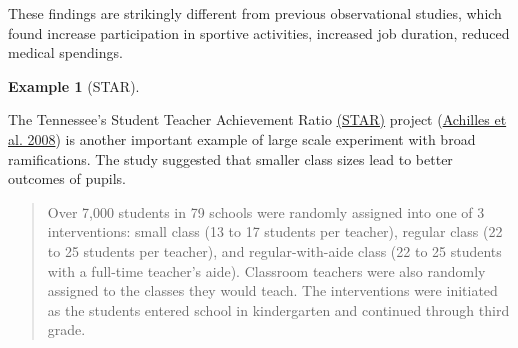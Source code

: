 \documentclass[
  11pt,
  letterpaper,
]{scrbook}
\theoremstyle{definition}
\newtheorem{example}{Example}[chapter]
\theoremstyle{remark}
\begin{document}
These findings are strikingly different from previous observational
studies, which found increase participation in sportive activities,
increased job duration, reduced medical spendings.

\begin{example}[STAR]\protect\hypertarget{exm-Tennesseestar}{}\label{exm-Tennesseestar}

The Tennessee's Student Teacher Achievement Ratio
\href{(https://dss.princeton.edu/catalog/resource1589)}{(STAR)} project
(\protect\hyperlink{ref-STAR2008}{Achilles et al. 2008}) is another
important example of large scale experiment with broad ramifications.
The study suggested that smaller class sizes lead to better outcomes of
pupils.

\begin{quote}
Over 7,000 students in 79 schools were randomly assigned into one of 3
interventions: small class (13 to 17 students per teacher), regular
class (22 to 25 students per teacher), and regular-with-aide class (22
to 25 students with a full-time teacher's aide). Classroom teachers were
also randomly assigned to the classes they would teach. The
interventions were initiated as the students entered school in
kindergarten and continued through third grade.
\end{quote}

\end{example}
\end{document}
